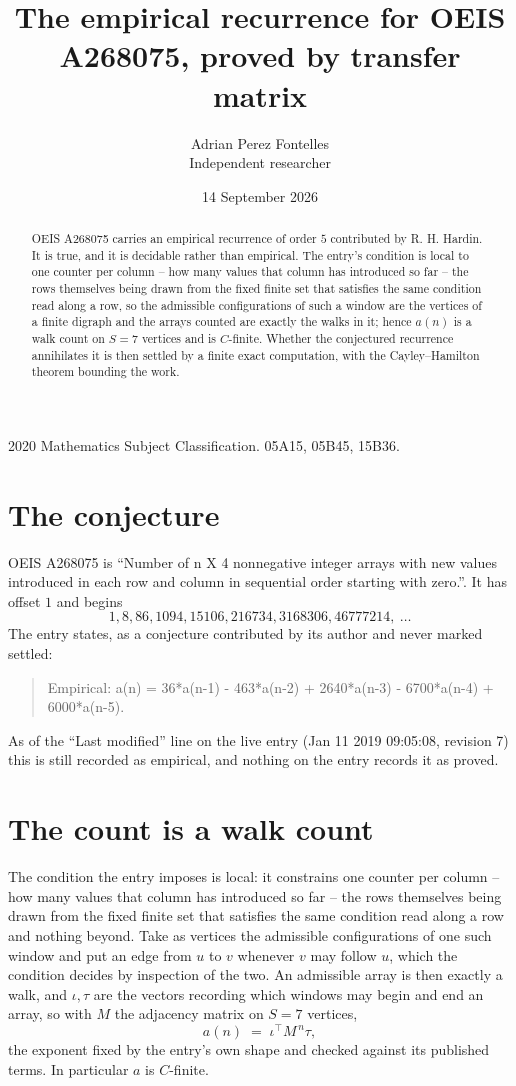 \documentclass[11pt,a4paper]{article}
\title{The empirical recurrence for OEIS A268075, proved by transfer matrix}
\author{Adrian Perez Fontelles\\ \small Independent researcher}
\date{14 September 2026}
\theoremstyle{plain}
\theoremstyle{definition}
\begin{document}
\maketitle

\begin{abstract}
OEIS A268075 carries an empirical recurrence of order $5$ contributed by R. H. Hardin. It is
true, and it is decidable rather than empirical. The entry's condition is local to one counter per column -- how many values that column has introduced so far -- the rows themselves being drawn from the fixed finite set that satisfies the same condition read along a row, so
the admissible configurations of such a window are the vertices of a finite digraph and the
arrays counted are exactly the walks in it; hence $a(n)$ is a walk count on $S=7$ vertices
and is $C$-finite. Whether the conjectured recurrence annihilates it is then settled by a
finite exact computation, with the Cayley--Hamilton theorem bounding the work.
\end{abstract}

\noindent\small 2020 Mathematics Subject Classification. 05A15, 05B45, 15B36.\normalsize

\section{The conjecture}

OEIS A268075 is ``Number of n X 4 nonnegative integer arrays with new values introduced in each row and column in sequential order starting with zero.''. It has offset $1$ and begins
\[
1, 8, 86, 1094, 15106, 216734, 3168306, 46777214,\ \dots
\]
The entry states, as a conjecture contributed by its author and never marked settled:
\begin{quote}
Empirical: a(n) = 36*a(n-1) - 463*a(n-2) + 2640*a(n-3) - 6700*a(n-4) + 6000*a(n-5).
\end{quote}
As of the ``Last modified'' line on the live entry (Jan 11 2019 09:05:08, revision 7) this is still
recorded as empirical, and nothing on the entry records it as proved.

\section{The count is a walk count}

The condition the entry imposes is local: it constrains one counter per column -- how many values that column has introduced so far -- the rows themselves being drawn from the fixed finite set that satisfies the same condition read along a row and nothing beyond. Take as vertices the admissible configurations of one such window and put an edge from $u$ to $v$ whenever $v$ may follow $u$, which the condition decides by inspection of the two.
An admissible array is then exactly a walk, and $\iota,\tau$ are the vectors recording which windows may begin and end an array, so with $M$ the adjacency matrix on $S=7$ vertices,
\[
a(n)\;=\;\iota^{\!\top}M^{\,n}\tau ,
\]
the exponent fixed by the entry's own shape and checked against its published terms. In
particular $a$ is $C$-finite.
\end{document}
